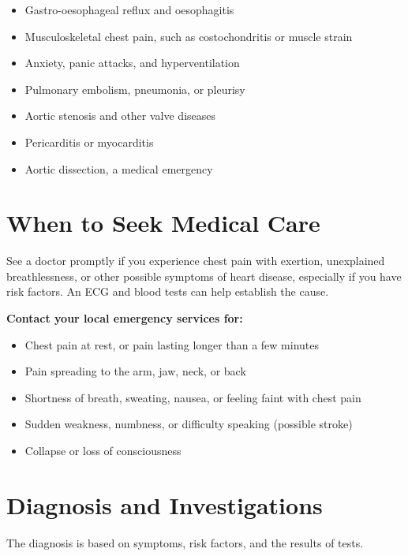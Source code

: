 \begin{itemize}
    \item Gastro-oesophageal reflux and oesophagitis
    \item Musculoskeletal chest pain, such as costochondritis or muscle strain
    \item Anxiety, panic attacks, and hyperventilation
    \item Pulmonary embolism, pneumonia, or pleurisy
    \item Aortic stenosis and other valve diseases
    \item Pericarditis or myocarditis
    \item Aortic dissection, a medical emergency
\end{itemize}

\section*{When to Seek Medical Care}
See a doctor promptly if you experience chest pain with exertion, unexplained breathlessness, or other possible symptoms of heart disease, especially if you have risk factors. An ECG and blood tests can help establish the cause.

\textbf{Contact your local emergency services for:}
\begin{itemize}
    \item Chest pain at rest, or pain lasting longer than a few minutes
    \item Pain spreading to the arm, jaw, neck, or back
    \item Shortness of breath, sweating, nausea, or feeling faint with chest pain
    \item Sudden weakness, numbness, or difficulty speaking (possible stroke)
    \item Collapse or loss of consciousness
\end{itemize}

\section*{Diagnosis and Investigations}
The diagnosis is based on symptoms, risk factors, and the results of tests.

